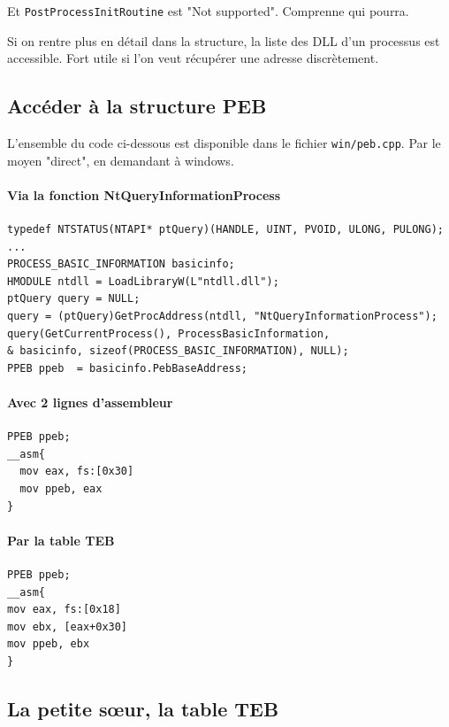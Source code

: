 \documentclass{book}
\newcommand{\code}[1]{\texttt{#1}}
\newcommand{\Windows}{{\sc windows}}
\begin{document}
Et \code{PostProcessInitRoutine} est "Not supported". Comprenne qui pourra. 

Si on rentre plus en détail dans la structure, la liste des DLL d'un processus est accessible. Fort utile si l'on veut récupérer une adresse discrètement.  

\subsection{Accéder à la structure PEB}

L'ensemble du code ci-dessous est disponible dans le fichier \code{win/peb.cpp}. Par le moyen "direct", en demandant à \Windows. 

\paragraph{Via la fonction NtQueryInformationProcess}

\begin{verbatim}
typedef NTSTATUS(NTAPI* ptQuery)(HANDLE, UINT, PVOID, ULONG, PULONG);
...
PROCESS_BASIC_INFORMATION basicinfo;
HMODULE ntdll = LoadLibraryW(L"ntdll.dll");
ptQuery query = NULL;
query = (ptQuery)GetProcAddress(ntdll, "NtQueryInformationProcess");
query(GetCurrentProcess(), ProcessBasicInformation, 
& basicinfo, sizeof(PROCESS_BASIC_INFORMATION), NULL);
PPEB ppeb  = basicinfo.PebBaseAddress;
\end{verbatim}

\paragraph{Avec 2 lignes d'assembleur}

\begin{verbatim}
PPEB ppeb;
__asm{
  mov eax, fs:[0x30]
  mov ppeb, eax
}
\end{verbatim}

\paragraph{Par la table TEB}

\begin{verbatim}
PPEB ppeb;
__asm{
mov eax, fs:[0x18]
mov ebx, [eax+0x30]
mov ppeb, ebx
}
\end{verbatim}

\subsection{La petite s\oe ur, la table TEB}
\end{document}
